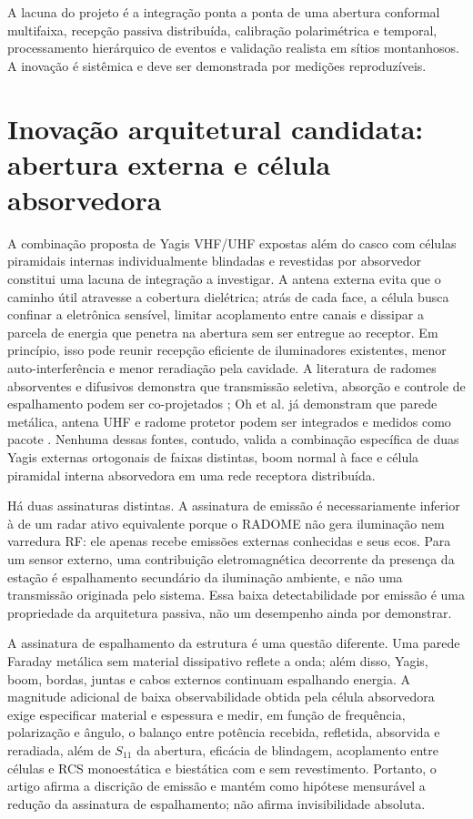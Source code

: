 A lacuna do projeto é a integração ponta a ponta de uma abertura conformal multifaixa, recepção passiva distribuída, calibração polarimétrica e temporal, processamento hierárquico de eventos e validação realista em sítios montanhosos. A inovação é sistêmica e deve ser demonstrada por medições reproduzíveis.

\section{Inovação arquitetural candidata: abertura externa e célula absorvedora}
A combinação proposta de Yagis VHF/UHF expostas além do casco com células piramidais internas individualmente blindadas e revestidas por absorvedor constitui uma lacuna de integração a investigar. A antena externa evita que o caminho útil atravesse a cobertura dielétrica; atrás de cada face, a célula busca confinar a eletrônica sensível, limitar acoplamento entre canais e dissipar a parcela de energia que penetra na abertura sem ser entregue ao receptor. Em princípio, isso pode reunir recepção eficiente de iluminadores existentes, menor auto-interferência e menor reradiação pela cavidade. A literatura de radomes absorventes e difusivos demonstra que transmissão seletiva, absorção e controle de espalhamento podem ser co-projetados \cite{costa2012,lv2021}; Oh et al. já demonstram que parede metálica, antena UHF e radome protetor podem ser integrados e medidos como pacote \cite{oh2026}. Nenhuma dessas fontes, contudo, valida a combinação específica de duas Yagis externas ortogonais de faixas distintas, boom normal à face e célula piramidal interna absorvedora em uma rede receptora distribuída.

Há duas assinaturas distintas. A assinatura de emissão é necessariamente inferior à de um radar ativo equivalente porque o RADOME não gera iluminação nem varredura RF: ele apenas recebe emissões externas conhecidas e seus ecos. Para um sensor externo, uma contribuição eletromagnética decorrente da presença da estação é espalhamento secundário da iluminação ambiente, e não uma transmissão originada pelo sistema. Essa baixa detectabilidade por emissão é uma propriedade da arquitetura passiva, não um desempenho ainda por demonstrar.

A assinatura de espalhamento da estrutura é uma questão diferente. Uma parede Faraday metálica sem material dissipativo reflete a onda; além disso, Yagis, boom, bordas, juntas e cabos externos continuam espalhando energia. A magnitude adicional de baixa observabilidade obtida pela célula absorvedora exige especificar material e espessura e medir, em função de frequência, polarização e ângulo, o balanço entre potência recebida, refletida, absorvida e reradiada, além de $S_{11}$ da abertura, eficácia de blindagem, acoplamento entre células e RCS monoestática e biestática com e sem revestimento. Portanto, o artigo afirma a discrição de emissão e mantém como hipótese mensurável a redução da assinatura de espalhamento; não afirma invisibilidade absoluta.

